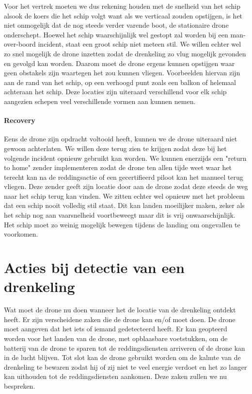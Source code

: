 Voor het vertrek moeten we dus rekening houden met de snelheid van het schip alsook de koers die het schip volgt want als we verticaal zouden opstijgen, is het niet onmogelijk dat de nog steeds verder varende boot, de stationaire drone onderschept. Hoewel het schip waarschijnlijk wel gestopt zal worden bij een man-over-boord incident, staat een groot schip niet meteen stil. We willen echter wel zo snel mogelijk de drone inzetten zodat de drenkeling zo vlug mogelijk gevonden en gevolgd kan worden. Daarom moet de drone ergens kunnen opstijgen waar geen obstakels zijn waartegen het zou kunnen vliegen. Voorbeelden hiervan zijn aan de rand van het schip, op een verhoogd punt zoals een balkon of helemaal achteraan het schip. Deze locaties zijn uiteraard verschillend voor elk schip aangezien schepen veel verschillende vormen aan kunnen nemen.

\paragraph{Recovery}

Eens de drone zijn opdracht voltooid heeft, kunnen we de drone uiteraard niet gewoon achterlaten. We willen deze terug zien te krijgen zodat deze bij het volgende incident opnieuw gebruikt kan worden. We kunnen enerzijds een "return to home" zender implementeren zodat de drone ten allen tijde weet waar het terecht kan na de reddingsactie of een gecertifieerd piloot kan het manueel terug vliegen. Deze zender geeft zijn locatie door aan de drone zodat deze steeds de weg naar het schip terug kan vinden. We zitten echter wel opnieuw met het probleem dat een schip nooit volledig stil staat. Dit kan landen moeilijker maken, zeker als het schip nog aan vaarsnelheid voortbeweegt maar dit is vrij onwaarschijnlijk. Het schip moet zo weinig mogelijk bewegen tijdens de landing om ongevallen te voorkomen.

\section{Acties bij detectie van een drenkeling}

Wat moet de drone nu doen wanneer het de locatie van de drenkeling ontdekt heeft. Er zijn verscheidene zaken die de drone kan en/of moet doen. De drone moet aangeven dat het iets of iemand gedetecteerd heeft. Er kan geopteerd worden voor het landen van de drone, met opblaasbare voetstukken, om de batterij van de drone te sparen tot de reddingsdiensten arriveren of de drone kan in de lucht blijven. Tot slot kan de drone gebruikt worden om de kalmte van de drenkeling te bewaren zodat hij of zij niet te veel energie verdoet en het zo langer kan uithouden tot de reddingsdiensten aankomen. Deze zaken zullen we nu bespreken.


